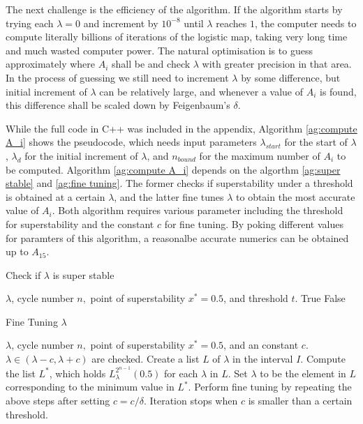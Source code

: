 The next challenge is the efficiency of the algorithm. 
If the algorithm starts by trying each $\lambda = 0$ and increment by $10^{-8}$ until $\lambda$ reaches $1$, the computer needs to compute literally billions of iterations of the logistic map, taking very long time and much wasted computer power.
The natural optimisation is to guess approximately where $A_i$ shall be and check $\lambda$ with greater precision in that area. 
In the process of guessing we still need to increment $\lambda$ by some difference, but initial increment of $\lambda$ can be relatively large, and whenever a value of $A_i$ is found, this difference shall be scaled down by Feigenbaum's  $\delta$.


While the full code in C++ was included in the appendix,
Algorithm \ref{ag:compute A_i} shows the pseudocode, which needs input parameters $\lambda_{start}$ for the start of $\lambda$, $\lambda_d$ for the initial increment of $\lambda$, and $n_{bound}$ for the maximum number of $A_i$ to be computed.
Algorithm \ref{ag:compute A_i} depends on the algorthm \ref{ag:super stable} and \ref{ag:fine tuning}. 
The former checks if superstability under a threshold is obtained at a certain $\lambda$, and the latter fine tunes $\lambda$ to obtain the most accurate value of $A_i$.
Both algorithm requires various parameter including the threshold for superstability and the constant $c$ for fine tuning.
By poking different values for paramters of this algorithm, a reasonalbe accurate numerics can be obtained up to $A_{15}$.


\begin{algorithm}
	\caption{Check if $\lambda$ is super stable}
	\begin{algorithmic}[1]
		\Require $\lambda$, cycle number $n,$ point of superstability $x^* = 0.5$, and threshold $t$.
		\State \Return True
		\Else
		\State \Return False
		\EndIf
	\end{algorithmic}
	\label{ag:super stable}
\end{algorithm}

\begin{algorithm}
	\caption{Fine Tuning $\lambda$}
	\begin{algorithmic}[1]
		\Require $\lambda$, cycle number $n,$ point of superstability $x^* = 0.5$, and an constant $c$. $\lambda \in (\lambda - c, \lambda +c)$ are checked.
		\State Create a list $L$ of $\lambda$ in the interval $I$.
		\State Compute the list $L^*$, which holds $L_{\lambda}^{2^{n-1}}(0.5)$ for each $\lambda$ in $L$.
		\State Set $\lambda$ to be the element in $L$ corresponding to the minimum value in $L^*$.
		\State Perform fine tuning by repeating the above steps after setting $c = c / \delta$. 
		\State Iteration stops when $c$ is smaller than a certain threshold.
	\end{algorithmic}
	\label{ag:fine tuning}
\end{algorithm}

